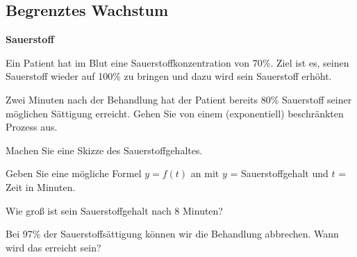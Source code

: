 
\subsection{Begrenztes Wachstum}






\bbwActAufgabenNr{} \textbf{Sauerstoff}

Ein Patient hat im Blut eine Sauerstoffkonzentration von 70\%. Ziel
ist es, seinen Sauerstoff wieder auf 100\% zu bringen und dazu wird
sein Sauerstoff erhöht.

Zwei Minuten nach der Behandlung hat der Patient bereits 80\%
Sauerstoff seiner möglichen Sättigung erreicht. Gehen Sie von einem
(exponentiell) beschränkten Prozess aus.

\begin{bbwAufgabenBlock}


\item Machen Sie eine Skizze des Sauerstoffgehaltes.

  
\item Geben Sie eine mögliche Formel $y = f(t)$ an mit $y$ = Sauerstoffgehalt und
$t$ = Zeit in Minuten.

  
\item Wie groß ist sein Sauerstoffgehalt nach 8 Minuten?

  
\item
  Bei 97\% der Sauerstoffsättigung können wir die Behandlung
abbrechen. Wann wird das erreicht sein?


\end{bbwAufgabenBlock}


